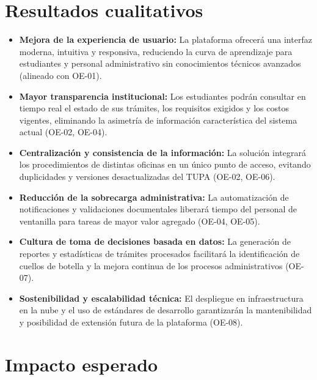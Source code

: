 \section{Resultados cualitativos}

\begin{itemize}
    \item \textbf{Mejora de la experiencia de usuario:} La plataforma ofrecerá una interfaz
    moderna, intuitiva y responsiva, reduciendo la curva de aprendizaje para estudiantes y
    personal administrativo sin conocimientos técnicos avanzados (alineado con OE-01).

    \item \textbf{Mayor transparencia institucional:} Los estudiantes podrán consultar en tiempo
    real el estado de sus trámites, los requisitos exigidos y los costos vigentes, eliminando
    la asimetría de información característica del sistema actual (OE-02, OE-04).

    \item \textbf{Centralización y consistencia de la información:} La solución integrará los
    procedimientos de distintas oficinas en un único punto de acceso, evitando duplicidades
    y versiones desactualizadas del TUPA (OE-02, OE-06).

    \item \textbf{Reducción de la sobrecarga administrativa:} La automatización de notificaciones
    y validaciones documentales liberará tiempo del personal de ventanilla para tareas de
    mayor valor agregado (OE-04, OE-05).

    \item \textbf{Cultura de toma de decisiones basada en datos:} La generación de reportes y
    estadísticas de trámites procesados facilitará la identificación de cuellos de botella y
    la mejora continua de los procesos administrativos (OE-07).

    \item \textbf{Sostenibilidad y escalabilidad técnica:} El despliegue en infraestructura en la
    nube y el uso de estándares de desarrollo garantizarán la mantenibilidad y posibilidad de
    extensión futura de la plataforma (OE-08).
\end{itemize}

\section{Impacto esperado}

